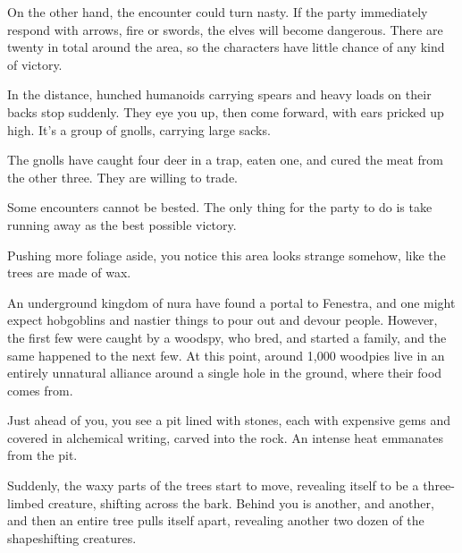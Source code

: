 \begin{multicols}{2}
\begin{speechtext}
\end{speechtext}

On the other hand, the encounter could turn nasty.
If the party immediately respond with arrows, fire or swords, the elves will become dangerous.
There are twenty in total around the area, so the characters have little chance of any kind of victory.


\begin{boxtext}

	In the distance, hunched humanoids carrying spears and heavy loads on their backs stop suddenly.
	They eye you up, then come forward, with ears pricked up high.
	It's a group of gnolls, carrying large sacks.

\end{boxtext}

The gnolls have caught four deer in a trap, eaten one, and cured the meat from the other three.  They are willing to trade.


\gnollhunter


Some encounters cannot be bested. The only thing for the party to do is take running away as the best possible victory.

\begin{boxtext}

	Pushing more foliage aside, you notice this area looks strange somehow, like the trees are made of wax.

\end{boxtext}

An underground kingdom of nura have found a portal to Fenestra, and one might expect hobgoblins and nastier things to pour out and devour people.  However, the first few were caught by a woodspy, who bred, and started a family, and the same happened to the next few.  At this point, around 1,000 woodpies live in an entirely unnatural alliance around a single hole in the ground, where their food comes from.

\begin{boxtext}

	Just ahead of you, you see a pit lined with stones, each with expensive gems and covered in alchemical writing, carved into the rock.
	An intense heat emmanates from the pit.

	Suddenly, the waxy parts of the trees start to move, revealing itself to be a three-limbed creature, shifting across the bark.  Behind you is another, and another, and then an entire tree pulls itself apart, revealing another two dozen of the shapeshifting creatures.


\end{boxtext}
\end{multicols}
